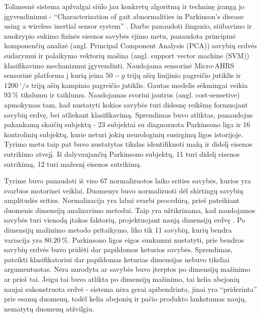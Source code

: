 \documentclass[]{vgtuef}
\begin{document}

Tolimesnė sistema apžvalgai siūlo jau konkretų algoritmą ir techninę įrangą jo įgyvendinimui - ``Characterization of gait abnormalities in Parkinson's disease using a wireless inertial sensor system'' \cite{5627904}. Darbe panaudoti žingsnio, siūbavimo ir nuokrypio sukimo fizinės eisenos savybės ėjimo metu, panaudota principinė komponenčių analizė (angl. Principal Component Analysis (PCA)) savybių erdvės sudarymui ir palaikymo vektorių mašina (angl. support vector machine (SVM)) klasifikavimo mechanizmui įgyvendinti. Naudojama sensorinė Micro-AHRS sensorinė platforma į kurią įeina $50-g$ trijų ašių linijinio pagreičio jutiklis ir $1200~^\circ/s$ trijų ašių kampinio pagreičio jutiklis. Gautas modelis sėkmingai veikia $93~\%$ tikslumu ir taiklumu. Naudojamas svoriui jautrus (angl. cost-sensetive) apmokymas tam, kad nustatyti kokios savybės turi didesnę reikšmę formuojant savybių erdvę, bei atliekant klasifikavimą. Sprendimas buvo atliktas, panaudojus pakankamą skaičių subjektų - 23 subjektai su diagnozuota Parkinsono liga ir 16 kontrolinių subjektų, kurie neturi jokių neurologinių susirgimų ligos istorijoje. Tyrimo metu taip pat buvo nustatytas tikslas identifikuoti mažą ir didelį eisenos sutrikimo atvejį. Iš dalyvaujančių Parkinsono subjektų, 11 turi didelį eisenos sutrikimą, 12 turi mažesnį eisenos sutrikimą. 

Tyrime buvo panaudoti iš viso 67 normalizuotos laiko srities savybės, kurios yra svarbios motorinei veiklai. Duomenys buvo normalizuoti dėl skirtingų savybių amplitudės srities. Normalizacija yra labai svarbi procedūrą, prieš pateikiant duomenis dimensijų analizavimo metodui. Taip yra užtikrinama, kad naudojamos savybės turi vienodą įtakos faktorių, projektuojant naują dimensijų erdvę \cite{824819}. Po dimensijų mažinimo metodo pritaikymo, liko tik 11 savybių, kurių bendra variacija yra $80.20~\%$. Parkinsono ligos eigos sunkumui nustatyti, prie bendros savybių erdvės buvo pridėti dar papildomos keturios savybės. Sprendimas, pateikti klasifikatoriui dar papildomas keturias dimensijas nebuvo tiksliai argumentuotas. Nėra nurodyta ar savybės buvo įterptos po dimensijų mažinimo ar prieš tai. Jeigu tai buvo atlikta po dimensijų mažinimo, tai kelia abejonių naujai sukonstruota erdvė - sistema nėra gerai apibendrinta, jinai yra ``priderinta'' prie esamų duomenų, todėl kelia abejonių ir pačio produkto lankstumas naujų, nematytų duomenų atžvilgiu. 
\end{document}
